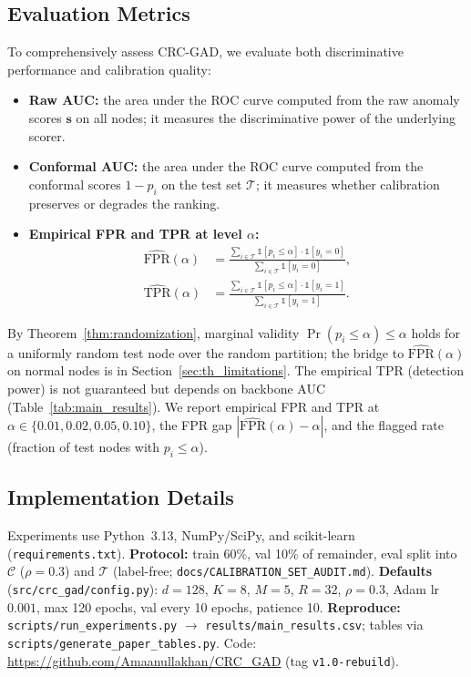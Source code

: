 \documentclass[a4paper]{cas-dc}
\theoremstyle{definition}
\begin{document}
\subsection{Evaluation Metrics}
\label{sec:exp_metrics}

To comprehensively assess CRC-GAD, we evaluate both discriminative performance and calibration quality:
\begin{itemize}
    \item \textbf{Raw AUC:} the area under the ROC curve computed from the raw anomaly scores $\mathbf{s}$ on all nodes; it measures the discriminative power of the underlying scorer.
    \item \textbf{Conformal AUC:} the area under the ROC curve computed from the conformal scores $1 - p_i$ on the test set $\mathcal{T}$; it measures whether calibration preserves or degrades the ranking.
    \item \textbf{Empirical FPR and TPR at level $\alpha$:}
    \begin{equation}
    \label{eq:fpr_tpr}
    \begin{aligned}
    \widehat{\mathrm{FPR}}(\alpha) &= 
    \frac{\sum_{i \in \mathcal{T}} \mathbb{1}[p_i \leq \alpha] \cdot \mathbb{1}[y_i = 0]}
    {\sum_{i \in \mathcal{T}} \mathbb{1}[y_i = 0]}, \\[4pt]
    \widehat{\mathrm{TPR}}(\alpha) &= 
    \frac{\sum_{i \in \mathcal{T}} \mathbb{1}[p_i \leq \alpha] \cdot \mathbb{1}[y_i = 1]}
    {\sum_{i \in \mathcal{T}} \mathbb{1}[y_i = 1]}.
    \end{aligned}
    \end{equation}
\end{itemize}
By Theorem~\ref{thm:randomization}, marginal validity $\Pr(p_i \leq \alpha) \leq \alpha$ holds for a uniformly random test node over the random partition; the bridge to $\widehat{\mathrm{FPR}}(\alpha)$ on normal nodes is in Section~\ref{sec:th_limitations}. The empirical TPR (detection power) is not guaranteed but depends on backbone AUC (Table~\ref{tab:main_results}). We report empirical FPR and TPR at $\alpha \in \{0.01, 0.02, 0.05, 0.10\}$, the FPR gap $|\widehat{\mathrm{FPR}}(\alpha) - \alpha|$, and the flagged rate (fraction of test nodes with $p_i \leq \alpha$).


\subsection{Implementation Details}
\label{sec:exp_implementation}

Experiments use Python~3.13, NumPy/SciPy, and scikit-learn (\texttt{requirements.txt}).
\textbf{Protocol:} train 60\%, val 10\% of remainder, eval split into $\mathcal{C}$ ($\rho=0.3$) and $\mathcal{T}$ (label-free; \texttt{docs/CALIBRATION\_SET\_AUDIT.md}).
\textbf{Defaults} (\texttt{src/crc\_gad/config.py}): $d{=}128$, $K{=}8$, $M{=}5$, $R{=}32$, $\rho{=}0.3$, Adam lr $0.001$, max 120 epochs, val every 10 epochs, patience 10.
\textbf{Reproduce:} \texttt{scripts/run\_experiments.py} $\to$ \texttt{results/main\_results.csv}; tables via \texttt{scripts/generate\_paper\_tables.py}.
Code: \url{https://github.com/Amaanullakhan/CRC_GAD} (tag \texttt{v1.0-rebuild}).
\end{document}
